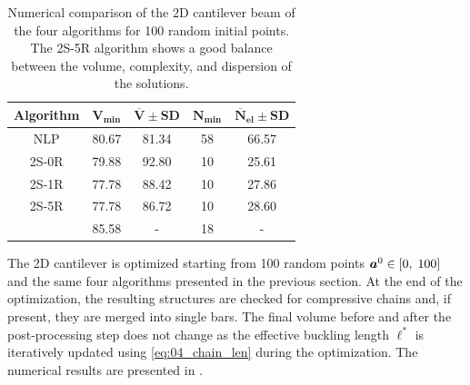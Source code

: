\begin{table}
    \small
\centering
\begin{tabular}{cSS[table-format = 2.2(1), separate-uncertainty]S[table-format = 2.0]S[table-format = 2.2(1), separate-uncertainty]}
\toprule
\textbf{Algorithm} &
   &
   &
   &
   \\ \midrule
NLP & 80.67 & 81.34  & 58 & 66.57 \\
2S-0R & 79.88 & 92.80  & 10 & 25.61 \\
2S-1R & 77.78 & 88.42  & 10 & 27.86 \\
2S-5R & 77.78 & 86.72  & 10 & 28.60  \\
\midrule
\cite{achtziger_local_1999b} &85.58&{-}&18&{-}  \\\bottomrule
\end{tabular}
\caption{Numerical comparison of the 2D cantilever beam of the four algorithms for 100 random initial points. The 2S-5R algorithm shows a good balance between the volume, complexity, and dispersion of the solutions.}
\label{tab:04_2d_cant_solution}
\end{table}

The 2D cantilever is optimized starting from 100 random points $\bm{a}^0 \in [0,\;100]$ and the same four algorithms presented in the previous section. At the end of the optimization, the resulting structures are checked for compressive chains and, if present, they are merged into single bars. The final volume before and after the post-processing step does not change as the effective buckling length $\ell^*$ is iteratively updated using \eqref{eq:04_chain_len} during the optimization. The numerical results are presented in .

